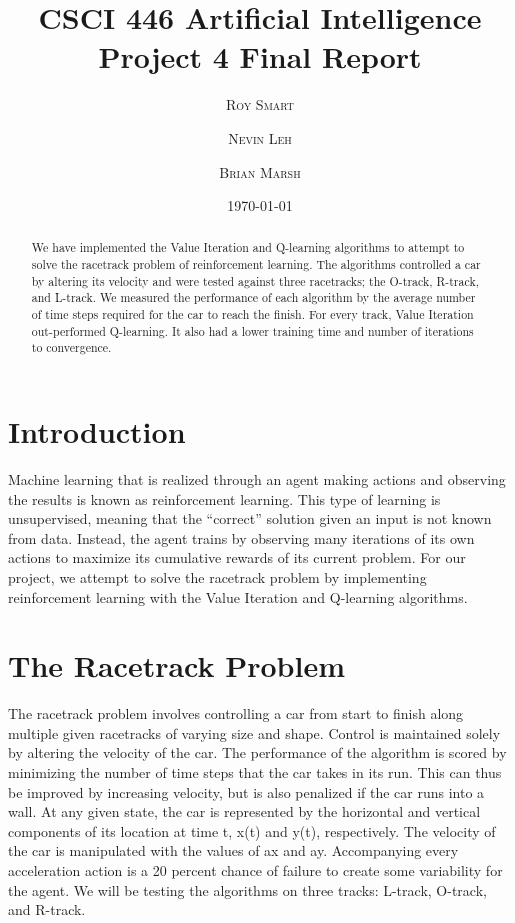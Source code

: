 \documentclass{article}
\title{\vspace{-15mm}\fontsize{24pt}{10pt}\selectfont\textbf{CSCI 446 Artificial Intelligence \\[2mm] Project 4 Final Report} } %
\date{\today}
\author{
\large
\textsc{Roy Smart} \and \textsc{Nevin Leh} \and \textsc{Brian Marsh}\\[2mm] %
}
\begin{document}
	\maketitle %
	\thispagestyle{fancy} %
	\normalsize
	
\begin{abstract}

	We have implemented the Value Iteration and Q-learning algorithms to attempt to solve the racetrack problem of reinforcement learning.  The algorithms controlled a car by altering its velocity and were tested against three racetracks; the O-track, R-track, and L-track.  We measured the performance of each algorithm by the average number of time steps required for the car to reach the finish.  For every track, Value Iteration out-performed Q-learning.  It also had a lower training time and number of iterations to convergence.

\end{abstract}
	\section{Introduction}
		Machine learning that is realized through an agent making actions and observing the results is known as reinforcement learning.  This type of learning is unsupervised, meaning that the ``correct'' solution given an input is not known from data.  Instead, the agent trains by observing many iterations of its own actions to maximize its cumulative rewards of its current problem.  For our project, we attempt to solve the racetrack problem by implementing reinforcement learning with the Value Iteration and Q-learning algorithms.
	\section{The Racetrack Problem}
		The racetrack problem involves controlling a car from start to finish along multiple given racetracks of varying size and shape.  Control is maintained solely by altering the velocity of the car.  The performance of the algorithm is scored by minimizing the number of time steps that the car takes in its run.  This can thus be improved by increasing velocity, but is also penalized if the car runs into a wall.  At any given state, the car is represented by the horizontal and vertical components of its location at time t, x(t) and y(t), respectively.  The velocity of the car is manipulated with the values of ax and ay.  Accompanying every acceleration action is a 20 percent chance of failure to create some variability for the agent. We will be testing the algorithms on three tracks: L-track, O-track, and R-track. 
\end{document}
